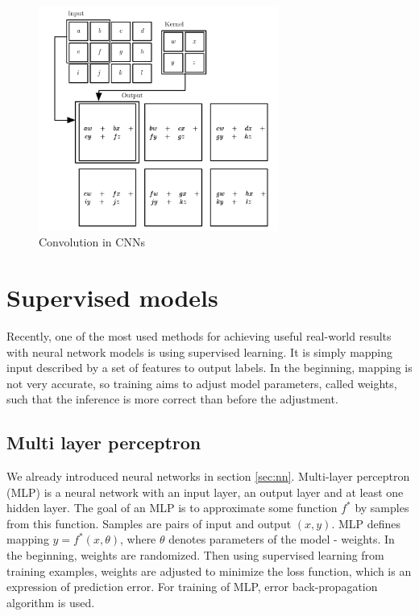 \begin{figure}
    \centering
    \includegraphics[width=0.7\textwidth]{figs/convo.png}
    \caption{Convolution in CNNs \cite{Goodfellow-et-al-2016}}
    \label{fig:convo}
\end{figure}

\section{Supervised models}

Recently, one of the most used methods for achieving useful real-world results with neural network models is using supervised learning. It is simply mapping input described by a set of features to output labels. In the beginning, mapping is not very accurate, so training aims to adjust model parameters, called weights, such that the inference is more correct than before the adjustment.

\subsection{Multi layer perceptron}
\label{mlp}
We already introduced neural networks in section \ref{sec:nn}. Multi-layer perceptron (MLP) is a neural network with an input layer, an output layer and at least one hidden layer. The goal of an MLP is to approximate some function $f^*$ by samples from this function. Samples are pairs of input and output $(x, y)$. MLP defines mapping $y = f^*(x, \theta)$, where $\theta$ denotes parameters of the model - weights. In the beginning, weights are randomized. Then using supervised learning from training examples, weights are adjusted to minimize the loss function, which is an expression of prediction error. For training of MLP, error back-propagation algorithm is used. \cite{Goodfellow-et-al-2016}


